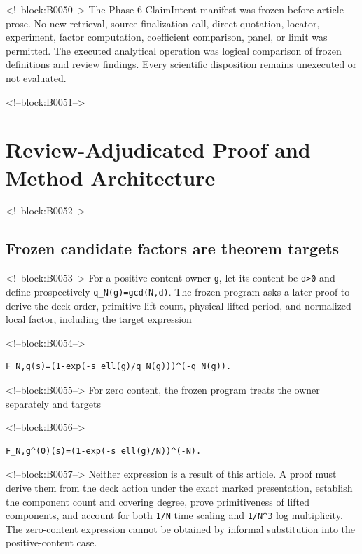 \documentclass[11pt]{article}
\begin{document}
<!--block:B0050-->
The Phase-6 ClaimIntent manifest was frozen before article prose. No new
retrieval, source-finalization call, direct quotation, locator,
experiment, factor computation, coefficient comparison, panel, or limit
was permitted. The executed analytical operation was logical comparison
of frozen definitions and review findings. Every scientific disposition
remains unexecuted or not evaluated.

<!--block:B0051-->
\hypertarget{4-review-adjudicated-proof-and-method-architecture}{%
\section{Review-Adjudicated Proof and Method
Architecture}\label{4-review-adjudicated-proof-and-method-architecture}}

<!--block:B0052-->
\hypertarget{41-frozen-candidate-factors-are-theorem-targets}{%
\subsection{Frozen candidate factors are theorem
targets}\label{41-frozen-candidate-factors-are-theorem-targets}}

<!--block:B0053-->
For a positive-content owner \texttt{g}, let its content be
\texttt{d\textgreater{}0} and define prospectively
\texttt{q\_N(g)=gcd(N,d)}. The frozen program asks a later proof to
derive the deck order, primitive-lift count, physical lifted period, and
normalized local factor, including the target expression

<!--block:B0054-->
\begin{verbatim}
F_N,g(s)=(1-exp(-s ell(g)/q_N(g)))^(-q_N(g)).
\end{verbatim}

<!--block:B0055-->
For zero content, the frozen program treats the owner separately and
targets

<!--block:B0056-->
\begin{verbatim}
F_N,g^(0)(s)=(1-exp(-s ell(g)/N))^(-N).
\end{verbatim}

<!--block:B0057-->
Neither expression is a result of this article. A proof must derive them from
the deck action under the exact marked presentation, establish the
component count and covering degree, prove primitiveness of lifted
components, and account for both \texttt{1/N} time scaling and
\texttt{1/N\^{}3} log multiplicity. The zero-content expression cannot
be obtained by informal substitution into the positive-content case.
\end{document}
